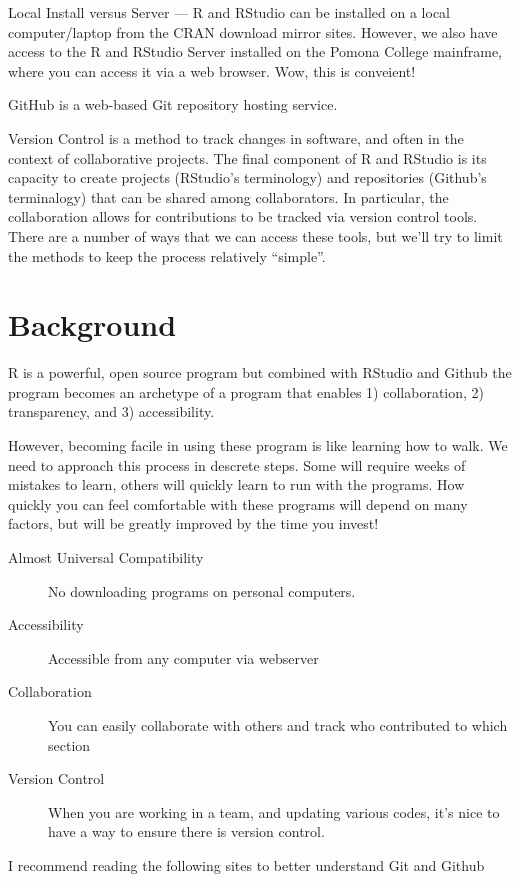 \documentclass[12pt]{../SOP3_beta}
\begin{document}
\NP Local Install versus Server --- R and RStudio can be installed on a local computer/laptop from the CRAN download mirror sites. However, we also have access to the R and RStudio Server installed on the Pomona College mainframe, where you can access it via a web browser. Wow, this is conveient!

\NP GitHub is a web-based Git repository hosting service. 

\NP Version Control is a method to track changes in software, and often in the context of collaborative projects. The final component of R and RStudio is its capacity to create projects (RStudio's terminology) and repositories (Github's terminalogy) that can be shared among collaborators. In particular, the collaboration allows for contributions to be tracked via version control tools. There are a number of ways that we can access these tools, but we'll try to limit the methods to keep the process relatively ``simple''.


\section{Background}

\NP R is a powerful, open source program but combined with RStudio and Github the program becomes an archetype of a program that enables 1) collaboration, 2) transparency, and 3) accessibility.

\NP However, becoming facile in using these program is like learning how to walk. We need to approach this process in descrete steps. Some will require weeks of mistakes to learn, others will quickly learn to run with the programs. How quickly you can feel comfortable with these programs will depend on many factors, but will be greatly improved by the time you invest!

\begin{description}
  \item[Almost Universal Compatibility] No downloading programs on personal computers.
  \item[Accessibility] Accessible from any computer via webserver
  \item[Collaboration] You can easily collaborate with others and track who contributed to which section
  \item[Version Control] When you are working in a team, and updating various codes, it's nice to have a way to ensure there is version control. 
\end{description}

\NP I recommend reading the following sites to better understand Git and Github
\end{document}
